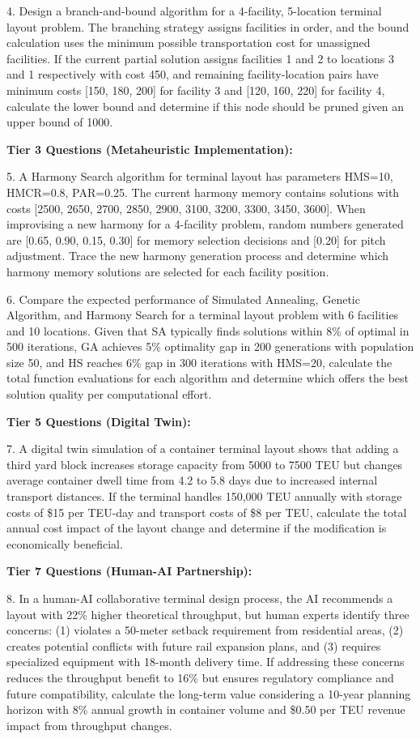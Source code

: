 \documentclass{article}
\begin{document}
4. Design a branch-and-bound algorithm for a 4-facility, 5-location terminal layout problem. The branching strategy assigns facilities in order, and the bound calculation uses the minimum possible transportation cost for unassigned facilities. If the current partial solution assigns facilities 1 and 2 to locations 3 and 1 respectively with cost 450, and remaining facility-location pairs have minimum costs [150, 180, 200] for facility 3 and [120, 160, 220] for facility 4, calculate the lower bound and determine if this node should be pruned given an upper bound of 1000.

\textbf{Tier 3 Questions (Metaheuristic Implementation):}

5. A Harmony Search algorithm for terminal layout has parameters HMS=10, HMCR=0.8, PAR=0.25. The current harmony memory contains solutions with costs [2500, 2650, 2700, 2850, 2900, 3100, 3200, 3300, 3450, 3600]. When improvising a new harmony for a 4-facility problem, random numbers generated are [0.65, 0.90, 0.15, 0.30] for memory selection decisions and [0.20] for pitch adjustment. Trace the new harmony generation process and determine which harmony memory solutions are selected for each facility position.

6. Compare the expected performance of Simulated Annealing, Genetic Algorithm, and Harmony Search for a terminal layout problem with 6 facilities and 10 locations. Given that SA typically finds solutions within 8\% of optimal in 500 iterations, GA achieves 5\% optimality gap in 200 generations with population size 50, and HS reaches 6\% gap in 300 iterations with HMS=20, calculate the total function evaluations for each algorithm and determine which offers the best solution quality per computational effort.

\textbf{Tier 5 Questions (Digital Twin):}

7. A digital twin simulation of a container terminal layout shows that adding a third yard block increases storage capacity from 5000 to 7500 TEU but changes average container dwell time from 4.2 to 5.8 days due to increased internal transport distances. If the terminal handles 150,000 TEU annually with storage costs of \$15 per TEU-day and transport costs of \$8 per TEU, calculate the total annual cost impact of the layout change and determine if the modification is economically beneficial.

\textbf{Tier 7 Questions (Human-AI Partnership):}

8. In a human-AI collaborative terminal design process, the AI recommends a layout with 22\% higher theoretical throughput, but human experts identify three concerns: (1) violates a 50-meter setback requirement from residential areas, (2) creates potential conflicts with future rail expansion plans, and (3) requires specialized equipment with 18-month delivery time. If addressing these concerns reduces the throughput benefit to 16\% but ensures regulatory compliance and future compatibility, calculate the long-term value considering a 10-year planning horizon with 8\% annual growth in container volume and \$0.50 per TEU revenue impact from throughput changes.
\end{document}
